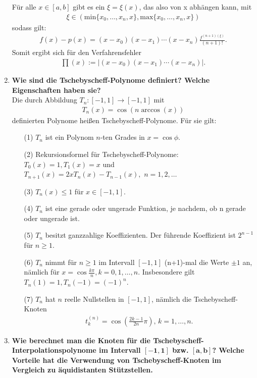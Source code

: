 \begin{enumerate}
			Für alle \( x\in[a,b] \) gibt es ein \( \xi=\xi(x) \), das also von x abhängen kann, mit
			\begin{align*}
				\xi \in \left( \text{min}\{x_0,\dots,x_n,x \}, \text{max}\{x_0,\dots,x_n,x \} \right)
			\end{align*}
			sodass gilt:
			\begin{align*}
				f(x)-p(x)=(x-x_0)(x-x_1)\cdots(x-x_n)\frac{f^{(n+1)\left(\xi\right)}}{(n+1)!}.
			\end{align*}
			Somit ergibt sich für den Verfahrensfehler
			\begin{align*}
				\prod(x):=|(x-x_0)(x-x_1)\cdots(x-x_n)|.
			\end{align*}
		\item \textbf{Wie sind die Tschebyscheff-Polynome definiert? Welche Eigenschaften haben sie?} \\
			Die durch Abbildung \(T_n:[-1,1]\rightarrow[-1,1]\) mit
			\begin{align*}
				T_n(x)=\cos(n\arccos(x))
			\end{align*}
			definierten Polynome heißen Tschebyscheff-Polynome. Für sie gilt:
			\begin{enumerate}
				\item[(1)] \(T_n\) ist ein Polynom \(n\)-ten Grades in \(x=\cos\phi\).
				\item[(2)] Rekursionsformel für Tschebyscheff-Polynome:\\
						\(T_0(x)=1, T_1(x)=x\) und \(T_{n+1}(x)=2xT_n(x)-T_{n-1}(x),\,\, n=1,2,\dots\)
				\item[(3)] \(T_n(x)\leq1\) für \(x\in[-1,1] \).
				\item[(4)] \(T_n\) ist eine gerade oder ungerade Funktion, je nachdem, ob n gerade oder ungerade ist.
				\item[(5)] \(T_n\) besitzt ganzzahlige Koeffizienten. Der führende Koeffizient ist \(2^{n-1}\) für \(n\geq1\).
				\item[(6)] \(T_n\) nimmt für \(n\geq 1\) im Intervall \([-1,1]\) (n+1)-mal die Werte \(\pm1\) an, nämlich für \(x=\cos\frac{k\pi}{n},k=0,1,\dots,n\). Insbesondere gilt \(T_n(1)=1, T_n(-1)=(-1)^n\).
				\item[(7)] \(T_n\) hat \(n\) reelle Nullstellen in \([-1,1]\), nämlich die Tschebyscheff-Knoten
					\begin{align*}
						t_k^{(n)}=\cos\left( \frac{2k-1}{2n}\pi \right),\, k=1,\dots,n. 
					\end{align*}
			\end{enumerate}
		\item \textbf{Wie berechnet man die Knoten für die Tschebyscheff-Interpolationspolynome im Intervall \(\mathbf{[−1,1]}\) bzw. \(\mathbf{[a,b]}\)? Welche Vorteile hat die Verwendung von Tschebyscheff-Knoten im Vergleich zu äquidistanten Stützstellen.} \\

\end{enumerate}
